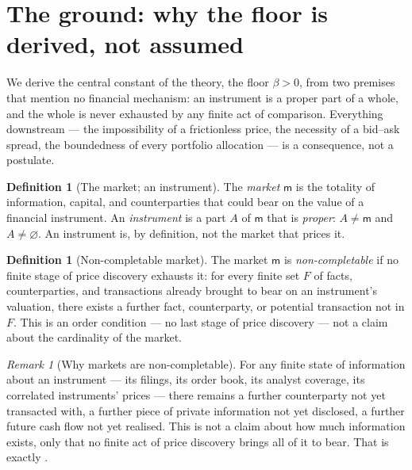 \documentclass[11pt,a4paper]{article}
\theoremstyle{thmstyle}
\theoremstyle{definition}
\newtheorem{definition}[theorem]{Definition}
\theoremstyle{remark}
\newtheorem{remark}[theorem]{Remark}
\newcommand{\flo}{\beta}
\newcommand{\medium}{\mathsf{m}}
\begin{document}
\section{The ground: why the floor is derived, not assumed}
\label{sec:ground}

We derive the central constant of the theory, the floor $\flo>0$, from
two premises that mention no financial mechanism: an instrument is a
proper part of a whole, and the whole is never exhausted by any finite
act of comparison. Everything downstream --- the impossibility of a
frictionless price, the necessity of a bid--ask spread, the boundedness
of every portfolio allocation --- is a consequence, not a postulate.

\begin{definition}[The market; an instrument]
\label{def:whole}
The \emph{market} $\medium$ is the totality of information, capital, and
counterparties that could bear on the value of a financial instrument.
An \emph{instrument} is a part $A$ of $\medium$ that is \emph{proper}:
$A\neq\medium$ and $A\neq\varnothing$. An instrument is, by definition,
not the market that prices it.
\end{definition}

\begin{definition}[Non-completable market]
\label{def:noncompletable}
The market $\medium$ is \emph{non-completable} if no finite stage of
price discovery exhausts it: for every finite set $F$ of facts,
counterparties, and transactions already brought to bear on an
instrument's valuation, there exists a further fact, counterparty, or
potential transaction not in $F$. This is an order condition --- no
last stage of price discovery --- not a claim about the cardinality of
the market.
\end{definition}

\begin{remark}[Why markets are non-completable]
\label{rem:why-noncompletable}
For any finite state of information about an instrument --- its filings,
its order book, its analyst coverage, its correlated instruments'
prices --- there remains a further counterparty not yet transacted with,
a further piece of private information not yet disclosed, a further
future cash flow not yet realised. This is not a claim about how much
information exists, only that no finite act of price discovery brings
all of it to bear. That is exactly .
\end{remark}
\end{document}
